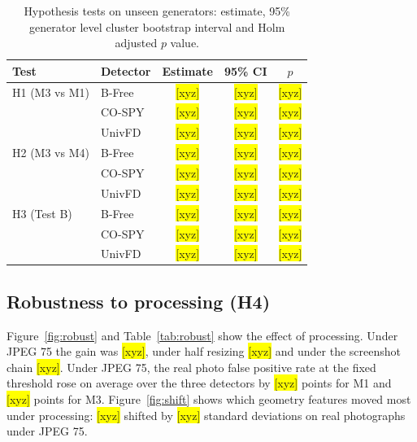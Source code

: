 \documentclass[11pt,a4paper]{article}
\newcommand{\xyz}[1][]{\colorbox{yellow}{[xyz]}}
\begin{document}
\begin{table}[t]
\centering
\caption{Hypothesis tests on unseen generators: estimate, 95\% generator level cluster bootstrap interval and Holm adjusted $p$ value.}
\label{tab:hyptests}
\small
\begin{tabular}{@{}llccc@{}}
\toprule
Test & Detector & Estimate & 95\% CI & $p$ \\
\midrule
H1 (M3 vs M1) & B-Free & \xyz[h1.bfree.delta] & \xyz[h1.bfree.ci] & \xyz[h1.bfree.p] \\
 & CO-SPY & \xyz[h1.cospy.delta] & \xyz[h1.cospy.ci] & \xyz[h1.cospy.p] \\
 & UnivFD & \xyz[h1.univfd.delta] & \xyz[h1.univfd.ci] & \xyz[h1.univfd.p] \\
H2 (M3 vs M4) & B-Free & \xyz[h2.bfree.delta] & \xyz[h2.bfree.ci] & \xyz[h2.bfree.p] \\
 & CO-SPY & \xyz[h2.cospy.delta] & \xyz[h2.cospy.ci] & \xyz[h2.cospy.p] \\
 & UnivFD & \xyz[h2.univfd.delta] & \xyz[h2.univfd.ci] & \xyz[h2.univfd.p] \\
H3 (Test B) & B-Free & \xyz[h3.bfree.delta] & \xyz[h3.bfree.ci] & \xyz[h3.bfree.p] \\
 & CO-SPY & \xyz[h3.cospy.delta] & \xyz[h3.cospy.ci] & \xyz[h3.cospy.p] \\
 & UnivFD & \xyz[h3.univfd.delta] & \xyz[h3.univfd.ci] & \xyz[h3.univfd.p] \\
\bottomrule
\end{tabular}
\end{table}

\subsection{Robustness to processing (H4)}

Figure~\ref{fig:robust} and Table~\ref{tab:robust} show the effect of processing. Under JPEG 75 the gain was \xyz[h4.jpeg75.range], under half resizing \xyz[h4.resize05.range]{} and under the screenshot chain \xyz[h4.screenshot.range]. Under JPEG 75, the real photo false positive rate at the fixed threshold rose on average over the three detectors by \xyz[h4.jpeg75.fpr_drift_m1]{} points for M1 and \xyz[h4.jpeg75.fpr_drift_m3]{} points for M3. Figure~\ref{fig:shift} shows which geometry features moved most under processing: \xyz[shift.top_feature]{} shifted by \xyz[shift.top_smd]{} standard deviations on real photographs under JPEG 75.
\end{document}
